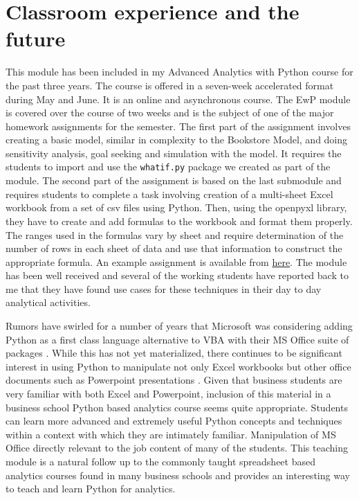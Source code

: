 \documentclass[ited,blindrev]{informs3}              %
\newcommand{\code}[1]{\texttt{#1}}
\begin{document}

\section{Classroom experience and the future}

This module has been included in my Advanced Analytics with Python course for the past three years. The course is offered in a seven-week accelerated format during May and June. It is an online and asynchronous course. The EwP module is covered over the course of two weeks and is the subject of one of the major homework assignments for the semester. The first part of the assignment involves creating a basic model, similar in complexity to the Bookstore Model, and doing sensitivity analysis, goal seeking and simulation with the model. It requires the students to import and use the \code{whatif.py} package we created as part of the module. The second part of the assignment is based on the last submodule and requires  students to complete a task involving creation of a multi-sheet Excel workbook from a set of csv files using Python. Then, using the openpyxl library, they have to create and add formulas to the workbook and format them properly. The ranges used in the formulas vary by sheet and require determination of the number of rows in each sheet of data and use that information to construct the appropriate formula. An example assignment is available from \href{}{here}. The module has been well received and several of the working students have reported back to me that they have found use cases for these techniques in their day to day analytical activities.

Rumors have swirled for a number of years that Microsoft was considering adding Python as a first class language alternative to VBA with their MS Office suite of packages \cite{bibid}. While this has not yet materialized, there continues to be significant interest in using Python to manipulate not only Excel workbooks but other office documents such as Powerpoint presentations \cite{bibid}. Given that business students are very familiar with both Excel and Powerpoint, inclusion of this material in a business school Python based analytics course seems quite appropriate. Students can learn more advanced and extremely useful Python concepts and techniques within a context with which they are intimately familiar. Manipulation of MS Office directly relevant to the job content of many of the students. This teaching module is a natural follow up to the commonly taught spreadsheet based analytics courses found in many business schools and provides an interesting way to teach and learn Python for analytics.
\end{document}
